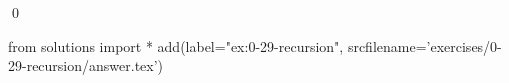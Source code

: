 
\begin{ex}
  \label{ex:0-29-recursion}
  
  \qed
\end{ex}
\begin{python0}
from solutions import *
add(label="ex:0-29-recursion",
    srcfilename='exercises/0-29-recursion/answer.tex')
\end{python0}
